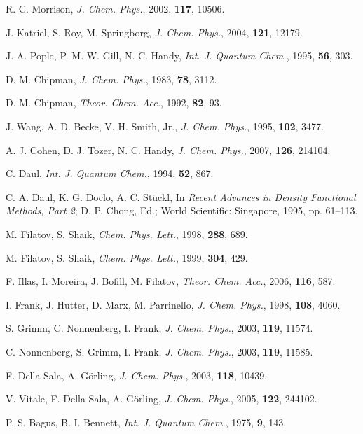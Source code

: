 \documentclass[%
 preprint, linenumbers,
 amsmath,amssymb,
 aps, physrev,
]{revtex4-2}
\begin{document}
\begin{thebibliography}{144}
 R. C. Morrison, \textit{J. Chem. Phys.}, 2002, \textbf{117}, 10506.

 J. Katriel, S. Roy, M. Springborg, \textit{J. Chem. Phys.}, 2004, \textbf{121}, 12179.

 J. A. Pople, P. M. W. Gill, N. C. Handy, \textit{Int. J. Quantum Chem.}, 1995, \textbf{56}, 303.

 D. M. Chipman, \textit{J. Chem. Phys.}, 1983, \textbf{78}, 3112.

 D. M. Chipman, \textit{Theor. Chem. Acc.}, 1992, \textbf{82}, 93.

 J. Wang, A. D. Becke, V. H. Smith, Jr., \textit{J. Chem. Phys.}, 1995, \textbf{102}, 3477.

 A. J. Cohen, D. J. Tozer, N. C. Handy, \textit{J. Chem. Phys.}, 2007, \textbf{126}, 214104.

 C. Daul, \textit{Int. J. Quantum Chem.}, 1994, \textbf{52}, 867.

 C. A. Daul, K. G. Doclo, A. C. Stückl, In \textit{Recent Advances in Density Functional Methods, Part 2}; D. P. Chong, Ed.; World Scientific: Singapore, 1995, pp. 61–113.

 M. Filatov, S. Shaik, \textit{Chem. Phys. Lett.}, 1998, \textbf{288}, 689.

 M. Filatov, S. Shaik, \textit{Chem. Phys. Lett.}, 1999, \textbf{304}, 429.

 F. Illas, I. Moreira, J. Bofill, M. Filatov, \textit{Theor. Chem. Acc.}, 2006, \textbf{116}, 587.

 I. Frank, J. Hutter, D. Marx, M. Parrinello, \textit{J. Chem. Phys.}, 1998, \textbf{108}, 4060.

 S. Grimm, C. Nonnenberg, I. Frank, \textit{J. Chem. Phys.}, 2003, \textbf{119}, 11574.

 C. Nonnenberg, S. Grimm, I. Frank, \textit{J. Chem. Phys.}, 2003, \textbf{119}, 11585.

 F. Della Sala, A. Görling, \textit{J. Chem. Phys.}, 2003, \textbf{118}, 10439.

 V. Vitale, F. Della Sala, A. Görling, \textit{J. Chem. Phys.}, 2005, \textbf{122}, 244102.

 P. S. Bagus, B. I. Bennett, \textit{Int. J. Quantum Chem.}, 1975, \textbf{9}, 143.


\end{thebibliography}
\end{document}
